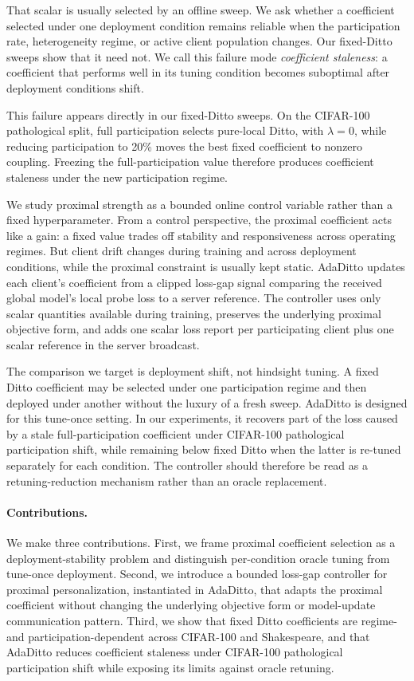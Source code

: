\documentclass[letterpaper]{article} %
\begin{document}
That scalar is usually selected by an offline sweep. We ask whether a
coefficient selected under one deployment condition remains reliable
when the participation rate, heterogeneity regime, or active client
population changes. Our fixed-Ditto sweeps show that it need not. We
call this failure mode \emph{coefficient staleness}: a coefficient that
performs well in its tuning condition becomes suboptimal after
deployment conditions shift.

This failure appears directly in our fixed-Ditto sweeps. On the
CIFAR-100 pathological split, full participation selects pure-local
Ditto, with $\lambda=0$, while reducing participation to 20\% moves the
best fixed coefficient to nonzero coupling. Freezing the
full-participation value therefore produces coefficient staleness under
the new participation regime.

We study proximal strength as a bounded online control variable rather
than a fixed hyperparameter. From a control perspective, the proximal
coefficient acts like a gain: a fixed value trades off stability and
responsiveness across operating regimes. But client drift changes
during training and across deployment conditions, while the proximal
constraint is usually kept static. AdaDitto updates each client's
coefficient from a clipped loss-gap signal comparing the received
global model's local probe loss to a server reference. The controller
uses only scalar quantities available during training, preserves the
underlying proximal objective form, and adds one scalar loss report per
participating client plus one scalar reference in the server
broadcast.

The comparison we target is deployment shift, not hindsight tuning. A
fixed Ditto coefficient may be selected under one participation regime
and then deployed under another without the luxury of a fresh sweep.
AdaDitto is designed for this tune-once setting. In our experiments,
it recovers part of the loss caused by a stale full-participation
coefficient under CIFAR-100 pathological participation shift, while
remaining below fixed Ditto when the latter is re-tuned separately for
each condition. The controller should therefore be read as a
retuning-reduction mechanism rather than an oracle replacement.

\paragraph{Contributions.}
We make three contributions. First, we frame proximal coefficient
selection as a deployment-stability problem and distinguish
per-condition oracle tuning from tune-once deployment. Second, we
introduce a bounded loss-gap controller for proximal personalization,
instantiated in AdaDitto, that adapts the proximal coefficient without
changing the underlying objective form or model-update communication
pattern. Third, we show that fixed Ditto coefficients are regime- and
participation-dependent across CIFAR-100 and Shakespeare, and that
AdaDitto reduces coefficient staleness under CIFAR-100 pathological
participation shift while exposing its limits against oracle retuning.
\end{document}
